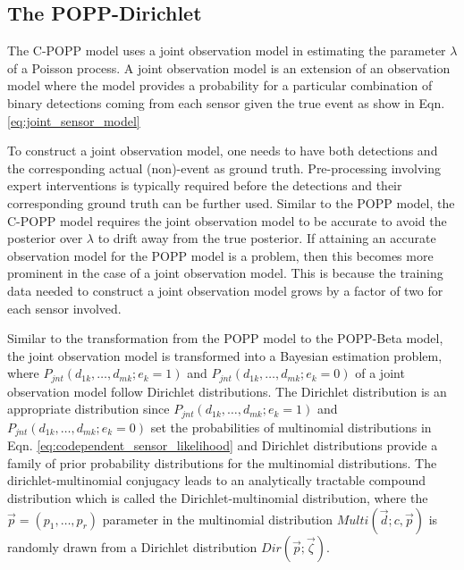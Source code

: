 \subsection{The POPP-Dirichlet}
\label{subsec:popd}

The C-POPP model uses a joint observation model in estimating the parameter $\lambda$ of a Poisson process. A joint observation model is an extension of an observation model where the model provides a probability for a particular combination of binary detections coming from each sensor given the true event as show in Eqn. \ref{eq:joint_sensor_model}

To construct a joint observation model, one needs to have both detections and the corresponding actual (non)-event as ground truth. Pre-processing involving expert interventions is typically required before the detections and their corresponding ground truth can be further used. Similar to the POPP model, the C-POPP model requires the joint observation model to be accurate to avoid the posterior over $\lambda$ to drift away from the true posterior. If attaining an accurate observation model for the POPP model is a problem, then this becomes more prominent in the case of a joint observation model. This is because the training data needed to construct a joint observation model grows by a factor of two for each sensor involved.       

Similar to the transformation from the POPP model to the POPP-Beta model, the joint observation model is transformed into a Bayesian estimation problem, where $P_{jnt}(d_{1k}, \ldots, d_{mk} ; e_k = 1)$ and $P_{jnt}(d_{1k}, \ldots, d_{mk} ; e_k = 0)$ of a joint observation model follow Dirichlet distributions. The Dirichlet distribution is an appropriate distribution since $P_{jnt}(d_{1k}, \ldots, d_{mk} ; e_k = 1)$ and $P_{jnt}(d_{1k}, \ldots, d_{mk} ; e_k = 0)$ set the probabilities of multinomial distributions in Eqn. \ref{eq:codependent_sensor_likelihood} and Dirichlet distributions provide a family of prior probability distributions for the multinomial distributions. The dirichlet-multinomial conjugacy leads to an analytically tractable compound distribution which is called the Dirichlet-multinomial distribution, where the $\overrightarrow{p} = (p_1, \ldots, p_r)$ parameter in the multinomial distribution $Multi(\overrightarrow{d} ; c, \overrightarrow{p})$ is randomly drawn from a Dirichlet distribution $Dir(\overrightarrow{p} ; \overrightarrow{\zeta})$. 

